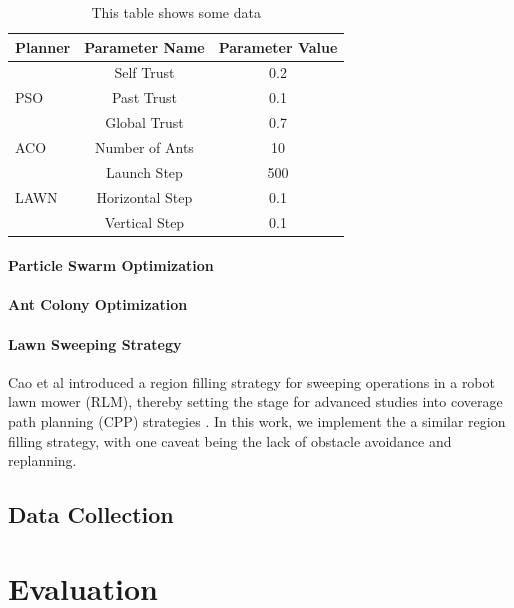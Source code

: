 \documentclass{report}
\begin{document}
\bgroup
\def\arraystretch{1.5}%
\begin{table}[h]
  \centering
  \begin{tabular}{|l|c|c|}
  \hline
  \textbf{Planner} & \textbf{Parameter Name} & \textbf{Parameter Value} \\
  \hline
  \multirow{3}{*}{PSO} & Self Trust & 0.2 \\
	& Past Trust & 0.1 \\
	& Global Trust & 0.7 \\
  \hline
  ACO & Number of Ants & 10 \\
  \hline
  \multirow{3}{*}{LAWN} & Launch Step & 500 \\
	& Horizontal Step & 0.1 \\
	& Vertical Step & 0.1 \\
  \hline
  \end{tabular}
  \caption{This table shows some data}
  \label{tab:myfirsttable}
\end{table}
\egroup

\subsubsection{Particle Swarm Optimization}
\subsubsection{Ant Colony Optimization}
\subsubsection{Lawn Sweeping Strategy}
Cao et al \cite{Cao1988} introduced a region filling strategy for sweeping operations in a robot lawn mower (RLM), thereby setting the stage for advanced studies into coverage path planning (CPP) strategies \cite{Galceran2013}. In this work, we implement the a similar region filling strategy, with one caveat being the lack of obstacle avoidance and replanning.

\section{Data Collection}

\chapter{Evaluation} \label{evaluation}
\end{document}
